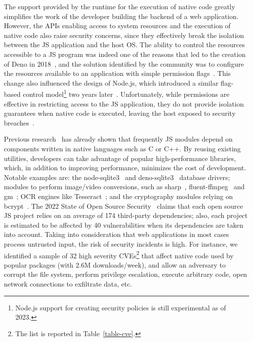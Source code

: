 The support provided by the runtime for the execution of native code
greatly simplifies the work of the developer building the backend of a
web application. However, the APIs enabling access to system resources
and the execution of native code also raise security concerns, since
they effectively break the isolation between the JS application and
the host OS. The ability to control the resources accessible to a JS
program was indeed one of the reasons that led to the creation of Deno
in 2018~\cite{nodejs-regret}, and the solution identified by the
community was to configure the resources available to an application
with simple permission flags~\cite{deno-permissions}. This change also
influenced the design of Node.js, which introduced a similar
flag-based control model\footnote{Node.js support for creating
  security policies is still experimental as of 2023.} two years
later~\cite{node-permissions}. Unfortunately, while permissions are
effective in restricting access to the JS application, they do not
provide isolation guarantees when native code is
executed,
leaving the host exposed to security breaches~\cite{deno-permissions}.

Previous research~\cite{staicu2021bilingual,npm-malicious-update} has
already shown that frequently JS modules depend on components written
in native languages such as C or C++.  By reusing existing utilities,
developers can take advantage of popular high-performance libraries,
which, in addition to improving performance, minimizes the cost of
development. Notable examples are: the node-sqlite3~\cite{
  node-sqlite3} and deno-sqlite3~\cite{deno-sqlite3} database drivers;
modules to perform image/video conversions, such as
sharp~\cite{sharp}, fluent-ffmpeg~\cite{fluentffmpeg-npm} and
gm~\cite{gm-npm}; OCR engines like Tesseract~\cite{tesseract}; and the
cryptography modules relying on bcrypt~\cite{bcrypt}. The 2022 State
of Open Source Security~\cite{snyk-report} claims that each open
source JS project relies on an average of 174 third-party
dependencies; also, each project is estimated to be affected by 40
vulnerabilities when its dependencies are taken into account. Taking
into consideration that web applications in most cases process
untrusted input, the risk of security incidents is high. For instance,
we identified a sample of 32 high severity CVEs\footnote{The list is
  reported in Table~\ref{table-cve}.} that affect native code used by
popular packages (with 2.6M \mbox{downloads/week}), and allow an
adversary to corrupt the file system, perform privilege escalation,
execute arbitrary code, open network connections to exfiltrate data,
etc.

